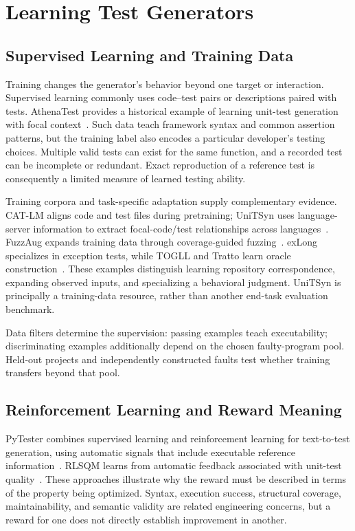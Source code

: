 \section{Learning Test Generators}
\label{sec:learning}
\subsection{Supervised Learning and Training Data}
Training changes the generator's behavior beyond one target or interaction. Supervised learning commonly uses code--test pairs or descriptions paired with tests. AthenaTest provides a historical example of learning unit-test generation with focal context~\cite{U11}. Such data teach framework syntax and common assertion patterns, but the training label also encodes a particular developer's testing choices. Multiple valid tests can exist for the same function, and a recorded test can be incomplete or redundant. Exact reproduction of a reference test is consequently a limited measure of learned testing ability.

Training corpora and task-specific adaptation supply complementary evidence. CAT-LM aligns code and test files during pretraining; UniTSyn uses language-server information to extract focal-code/test relationships across languages~\cite{T13,B09}. FuzzAug expands training data through coverage-guided fuzzing~\cite{T15}. exLong specializes in exception tests, while TOGLL and Tratto learn oracle construction~\cite{U16,O07,O09}. These examples distinguish learning repository correspondence, expanding observed inputs, and specializing a behavioral judgment. UniTSyn is principally a training-data resource, rather than another end-task evaluation benchmark.

Data filters determine the supervision: passing examples teach executability; discriminating examples additionally depend on the chosen faulty-program pool. Held-out projects and independently constructed faults test whether training transfers beyond that pool.

\subsection{Reinforcement Learning and Reward Meaning}
PyTester combines supervised learning and reinforcement learning for text-to-test generation, using automatic signals that include executable reference information~\cite{T01}. RLSQM learns from automatic feedback associated with unit-test quality~\cite{T12}. These approaches illustrate why the reward must be described in terms of the property being optimized. Syntax, execution success, structural coverage, maintainability, and semantic validity are related engineering concerns, but a reward for one does not directly establish improvement in another.

